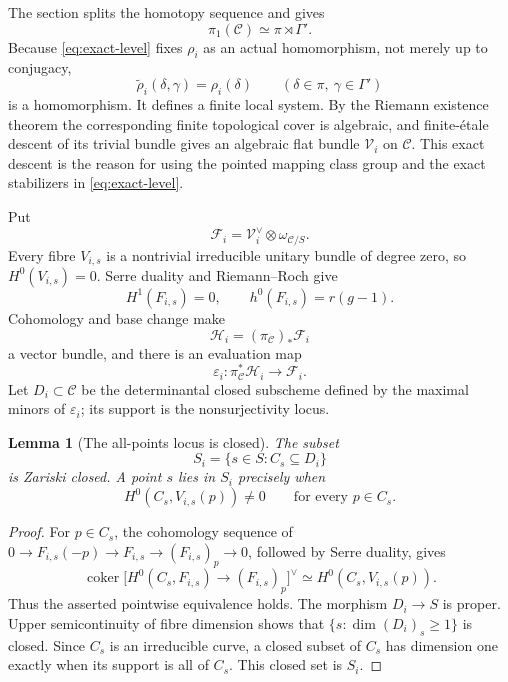 \documentclass[11pt,reqno]{amsart}
\numberwithin{equation}{section}
\newtheorem{lemma}[theorem]{Lemma}
\theoremstyle{definition}
\theoremstyle{remark}
\begin{document}
The section splits the homotopy sequence and gives
\[
\pi_1(\mathcal C)\simeq\pi\rtimes\Gamma'.
\]
Because \eqref{eq:exact-level} fixes $\rho_i$ as an actual homomorphism, not merely up to conjugacy,
\begin{equation}\label{eq:actual-descent}
\widetilde\rho_i(\delta,\gamma)=\rho_i(\delta)
\qquad(\delta\in\pi,\ \gamma\in\Gamma')
\end{equation}
is a homomorphism.  It defines a finite local system.  By the Riemann existence theorem the corresponding finite topological cover is algebraic, and finite-\'etale descent of its trivial bundle gives an algebraic flat bundle $\mathcal V_i$ on $\mathcal C$.  This exact descent is the reason for using the pointed mapping class group and the exact stabilizers in \eqref{eq:exact-level}.

Put
\[
\mathcal F_i=\mathcal V_i^\vee\otimes\omega_{\mathcal C/S}.
\]
Every fibre $V_{i,s}$ is a nontrivial irreducible unitary bundle of degree zero, so $H^0(V_{i,s})=0$.  Serre duality and Riemann--Roch give
\[
H^1(F_{i,s})=0,
\qquad h^0(F_{i,s})=r(g-1).
\]
Cohomology and base change make
\[
\mathcal H_i=(\pi_{\mathcal C})_*\mathcal F_i
\]
a vector bundle, and there is an evaluation map
\begin{equation}\label{eq:universal-evaluation}
\varepsilon_i:\pi_{\mathcal C}^*\mathcal H_i\longrightarrow\mathcal F_i.
\end{equation}
Let $D_i\subset\mathcal C$ be the determinantal closed subscheme defined by the maximal minors of $\varepsilon_i$; its support is the nonsurjectivity locus.

\begin{lemma}[The all-points locus is closed]\label{lem:all-points-closed}
The subset
\[
S_i=\{s\in S:C_s\subseteq D_i\}
\]
is Zariski closed.  A point $s$ lies in $S_i$ precisely when
\[
H^0(C_s,V_{i,s}(p))\ne0
\qquad\text{for every }p\in C_s.
\]
\end{lemma}

\begin{proof}
For $p\in C_s$, the cohomology sequence of
$0\to F_{i,s}(-p)\to F_{i,s}\to(F_{i,s})_p\to0$, followed by Serre duality, gives
\begin{equation}\label{eq:evaluation-duality}
\operatorname{coker}
\bigl[H^0(C_s,F_{i,s})\to(F_{i,s})_p\bigr]^\vee
\simeq H^0(C_s,V_{i,s}(p)).
\end{equation}
Thus the asserted pointwise equivalence holds.  The morphism $D_i\to S$ is proper.  Upper semicontinuity of fibre dimension shows that
$\{s:\dim(D_i)_s\ge1\}$ is closed.  Since $C_s$ is an irreducible curve, a closed subset of $C_s$ has dimension one exactly when its support is all of $C_s$.  This closed set is $S_i$.
\end{proof}
\end{document}
